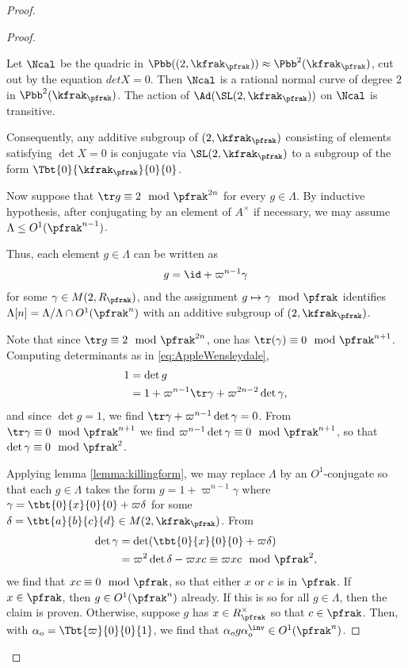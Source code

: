 \begin{proof}
\begin{proof}
    \begin{lemma}\label{lemma:killingform}
      Let $\Ncal$ be the quadric in $\Pbb(\sl(2,\kfrak_\pfrak))\approx \Pbb^2(\kfrak_\pfrak)$, cut out by the equation $det X =0$. Then $\Ncal$ is a rational normal curve of degree $2$ in $\Pbb^2(\kfrak_\pfrak)$. The action of $\Ad(\SL(2,\kfrak_\pfrak))$ on $\Ncal$ is transitive.

      Consequently, any additive subgroup of $\sl(2,\kfrak_\pfrak)$ consisting of elements satisfying $\det X = 0$ is conjugate via $\SL(2,\kfrak_\pfrak)$ to a subgroup of the form $\Tbt{0}{\kfrak_\pfrak}{0}{0}$.
    \end{lemma}
    Now suppose that $\tr g \equiv 2 \mod \pfrak^{2n}$ for every $g\in \Lambda$. By inductive hypothesis, after conjugating by an element of $A^\times$ if necessary, we may assume $\Lambda \leq O^1(\pfrak^{n-1})$.

    Thus, each element $g\in \Lambda$ can be written as
    \begin{align}\label{eq:AppleWensleydale}
      g = \id +\varpi^{n-1} \gamma
    \end{align}
    for some $\gamma \in M(2, R_\pfrak)$, and the assignment $g \mapsto \gamma \mod \pfrak$ identifies $\Lambda[n] = \Lambda /\Lambda \cap O^1(\pfrak^n)$ with an additive subgroup of $\sl(2,\kfrak_\pfrak)$.

    Note that since $\tr g \equiv 2 \mod \pfrak^{2n}$, one has $\tr(\gamma) \equiv 0 \mod \pfrak^{n+1}$.
    Computing determinants as in \ref{eq:AppleWensleydale},
    \begin{align*}
      1 & = \det g                                                  \\
        & = 1 + \varpi^{n-1} \tr \gamma + \varpi^{2n-2}\det \gamma,
    \end{align*}
    and since $\det g =1$, we find $\tr \gamma +\varpi^{n-1}\det \gamma =0$. From $\tr \gamma  \equiv 0 \mod \pfrak^{n+1}$ we find $ \varpi^{n-1}\det \gamma \equiv 0 \mod \pfrak^{n+1}$, so that $\det \gamma \equiv 0 \mod \pfrak^2$.

    Applying lemma \ref{lemma:killingform}, we may replace $\Lambda$ by an $O^1$-conjugate so that each $g \in \Lambda$ takes the form $g = 1 + \varpi^{n-1}\gamma$ where $\gamma = \tbt{0}{x}{0}{0} +\varpi\delta$ for some $\delta =\tbt{a}{b}{c}{d} \in M(2,\kfrak_\pfrak)$. From
    \begin{align*}
      \det \gamma & = \det (\tbt{0}{x}{0}{0} +\varpi\delta)                              \\
                  & = \varpi^2 \det \delta - \varpi x c  \equiv \varpi xc \mod \pfrak^2,
    \end{align*}
    we find that $xc \equiv 0 \mod \pfrak$, so that either $x$ or $c$ is in $\pfrak$. If $x\in \pfrak$, then $g \in O^1(\pfrak^n)$ already. If this is so for all $g \in \Lambda$, then the claim is proven. Otherwise, suppose $g$ has $x \in R_\pfrak^\times$ so that $c \in \pfrak$. Then, with $\alpha_o = \Tbt{\varpi}{0}{0}{1}$, we find that $\alpha_o g \alpha_o^\inv \in O^1(\pfrak^n)$.


\end{proof}
\end{proof}
